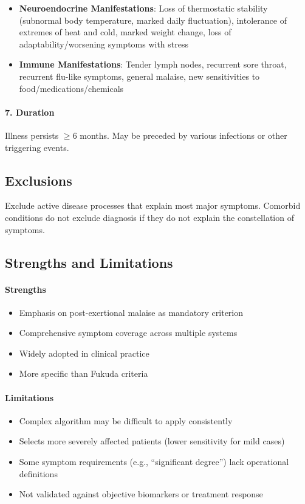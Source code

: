 \begin{requirement}
\begin{itemize}
    \item \textbf{Neuroendocrine Manifestations}: Loss of thermostatic stability (subnormal body temperature, marked daily fluctuation), intolerance of extremes of heat and cold, marked weight change, loss of adaptability/worsening symptoms with stress

    \item \textbf{Immune Manifestations}: Tender lymph nodes, recurrent sore throat, recurrent flu-like symptoms, general malaise, new sensitivities to food/medications/chemicals
\end{itemize}

\paragraph{7. Duration}
Illness persists $\geq$6 months. May be preceded by various infections or other triggering events.
\end{requirement}

\subsection{Exclusions}

Exclude active disease processes that explain most major symptoms. Comorbid conditions do not exclude diagnosis if they do not explain the constellation of symptoms.

\subsection{Strengths and Limitations}

\paragraph{Strengths}
\begin{itemize}
    \item Emphasis on post-exertional malaise as mandatory criterion
    \item Comprehensive symptom coverage across multiple systems
    \item Widely adopted in clinical practice
    \item More specific than Fukuda criteria
\end{itemize}

\paragraph{Limitations}
\begin{itemize}
    \item Complex algorithm may be difficult to apply consistently
    \item Selects more severely affected patients (lower sensitivity for mild cases)
    \item Some symptom requirements (e.g., ``significant degree'') lack operational definitions
    \item Not validated against objective biomarkers or treatment response
\end{itemize}


